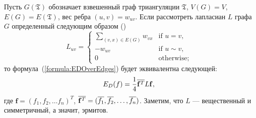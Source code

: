 Пусть $G(\mathfrak{T})$ обозначает взвешенный граф триангуляции $\mathfrak{T}$, $V(G) = V$, $E(G) = E(\mathfrak{T})$, вес ребра $(u, v) = w_{uv}$. 
Если рассмотреть лапласиан $L$ графа $G$ определенный следующим образом (\cite{Chen}) 
$$ L_{uv} = \begin{cases}
  \sum_{(v, x) \in E(G)}{w_{vx}}&\text{if $u = v,$} \\
  -w_{uv}&\text{if $u \sim v,$} \\
  0 &\text{otherwise;}
\end{cases}
$$ то формула~(\ref{formula:EDOverEdges}) будет эквивалентна следующей:
\begin{equation}
  \label{formula:EDOverLaplacian}
  E_D(f) = \frac{1}{4} \overline{\mathbf{f}^T} L \mathbf{f},
\end{equation}
где $\mathbf{f} = (f_1, f_2, \dots f_n)^T$, $\overline{\mathbf{f}^T} = 
(\overline{f_1}, \overline{f_2}, \dots, \overline{f_n})$. Заметим, что $L$ --- вещественный и 
симметричный, а значит, эрмитов.

